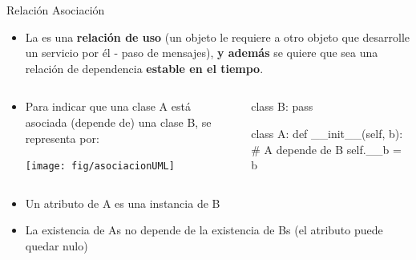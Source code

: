 \documentclass[10pt,envcountsect,spanish]{beamer}
\begin{document}







\begin{frame}[fragile]{Relación Asociación} 

\begin{itemize}
\item La  es una \textbf{relación de uso} (un objeto le requiere a otro objeto que desarrolle un servicio por él - paso de mensajes), \textbf{y 
además} se quiere que sea una relación de dependencia \textbf{estable en el tiempo}.

\end{itemize}



\begin{columns}
\begin{column}{.50\textwidth}
\begin{itemize}
\item Para indicar que una clase A está asociada (depende de) una clase B, se representa por:
\centerline{\texttt{[image: fig/asociacionUML]}}

\end{itemize}

\end{column}
\begin{column}{.41\textwidth}
 \scriptsize
\begin{pyconsole}[][frame=single]
class B:
    pass
    
class A:
    def __init__(self, b):
        # A depende de B
        self.__b = b  

\end{pyconsole}

\end{column}
\end{columns}


\begin{itemize}
\item Un atributo de A es una instancia de B

\item La existencia de As no depende de la existencia de Bs (el atributo puede quedar nulo)
\end{itemize}



\end{frame}
\end{document}
